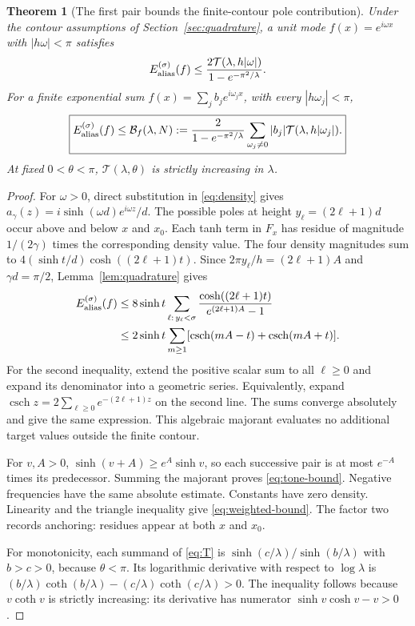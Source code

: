 \documentclass[11pt]{article}
\newtheorem{theorem}{Theorem}[section]
\theoremstyle{definition}\newtheorem{definition}[theorem]{Definition}
\theoremstyle{remark}\newtheorem{remark}[theorem]{Remark}
\numberwithin{equation}{section}
\DeclareMathOperator{\csch}{csch}
\newcommand{\T}{\mathcal T}
\begin{document}
\begin{theorem}[The first pair bounds the finite-contour pole contribution]
\label{thm:alias}
Under the contour assumptions of Section~\ref{sec:quadrature}, a unit mode $f(x)=e^{i\omega x}$ with $|h\omega|<\pi$ satisfies
\begin{equation}
 E_{\rm alias}^{(\sigma)}(f)
 \le\frac{2\T(\lambda,h|\omega|)}{1-e^{-\pi^2/\lambda}}.
 \label{eq:tone-bound}
\end{equation}
For a finite exponential sum $f(x)=\sum_jb_je^{i\omega_jx}$, with every $|h\omega_j|<\pi$,
\begin{equation}
 \boxed{E_{\rm alias}^{(\sigma)}(f)
 \le\mathcal B_f(\lambda,N):=
 \frac{2}{1-e^{-\pi^2/\lambda}}
 \sum_{\omega_j\ne0}|b_j|\T(\lambda,h|\omega_j|).}
 \label{eq:weighted-bound}
\end{equation}
At fixed $0<\theta<\pi$, $\T(\lambda,\theta)$ is strictly increasing in $\lambda$.
\end{theorem}
\begin{proof}
For $\omega>0$, direct substitution in \eqref{eq:density} gives
$a_\gamma(z)=i\sinh(\omega d)e^{i\omega z}/d$.
The possible poles at height $y_\ell=(2\ell+1)d$ occur above and below $x$ and $x_0$. Each tanh term in $F_x$ has residue of magnitude $1/(2\gamma)$ times the corresponding density value. The four density magnitudes sum to
$4(\sinh t/d)\cosh((2\ell+1)t)$.
Since $2\pi y_\ell/h=(2\ell+1)A$ and $\gamma d=\pi/2$, Lemma~\ref{lem:quadrature} gives
\begin{align}
 E_{\rm alias}^{(\sigma)}(f)
 &\le8\sinh t\sum_{\ell:\,y_\ell<\sigma}
 \frac{\cosh((2\ell+1)t)}{e^{(2\ell+1)A}-1}\notag\\
 &\le2\sinh t\sum_{m\ge1}
 [\csch(mA-t)+\csch(mA+t)].
 \label{eq:pair-series}
\end{align}
For the second inequality, extend the positive scalar sum to all $\ell\ge0$ and expand its denominator into a geometric series. Equivalently, expand $\csch z=2\sum_{\ell\ge0}e^{-(2\ell+1)z}$ on the second line. The sums converge absolutely and give the same expression. This algebraic majorant evaluates no additional target values outside the finite contour.

For $v,A>0$, $\sinh(v+A)\ge e^A\sinh v$, so each successive pair is at most $e^{-A}$ times its predecessor. Summing the majorant proves \eqref{eq:tone-bound}. Negative frequencies have the same absolute estimate. Constants have zero density. Linearity and the triangle inequality give \eqref{eq:weighted-bound}. The factor two records anchoring: residues appear at both $x$ and $x_0$.

For monotonicity, each summand of \eqref{eq:T} is $\sinh(c/\lambda)/\sinh(b/\lambda)$ with $b>c>0$, because $\theta<\pi$. Its logarithmic derivative with respect to $\log\lambda$ is
$(b/\lambda)\coth(b/\lambda)-(c/\lambda)\coth(c/\lambda)>0$.
The inequality follows because $v\coth v$ is strictly increasing: its derivative has numerator $\sinh v\cosh v-v>0$.
\end{proof}
\end{document}
